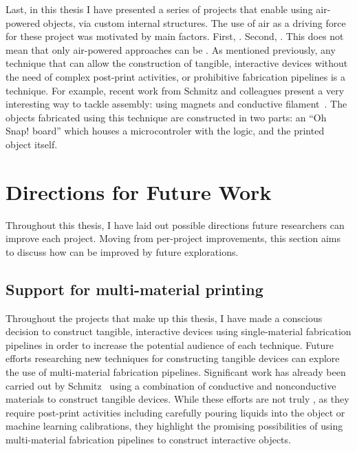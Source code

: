     Last, in this thesis I have presented a series of projects that enable \papf
    using air-powered objects, via custom internal structures. The use of air as
    a driving force for these project was motivated by  main factors.
    First, . Second, . This does not mean that
    only air-powered approaches can be \pap. As mentioned previously, any
    technique that can allow the construction of tangible, interactive devices
    without the need of complex post-print activities, or prohibitive
    fabrication pipelines is a \papf technique. For example, recent work from
    Schmitz and colleagues present a very interesting way to tackle assembly:
    using magnets and conductive filament~\cite{Schmitz:2021}. The objects
    fabricated using this technique are constructed in two parts: an ``Oh Snap!
    board'' which houses a microcontroler with the logic, and the printed object
    itself.

  \section{Directions for Future Work}
    Throughout this thesis, I have laid out possible directions future
    researchers can improve each project. Moving from per-project improvements,
    this section aims to discuss how \papf can be improved by future
    explorations.

    \subsection{Support for multi-material printing}
      Throughout the projects that make up this thesis, I have made a conscious
      decision to construct tangible, interactive devices using single-material
      fabrication pipelines in order to increase the potential audience of each
      technique. Future efforts researching new \pap techniques for constructing
      tangible devices can explore the use of multi-material fabrication
      pipelines. Significant work has already been carried out by
      Schmitz~\cite{Schmitz:2019a} using a combination of conductive and
      nonconductive materials to construct tangible devices. While these efforts
      are not truly \pap, as they require post-print activities including
      carefully pouring liquids into the object or machine learning
      calibrations, they highlight the promising possibilities of using
      multi-material fabrication pipelines to construct interactive objects.

